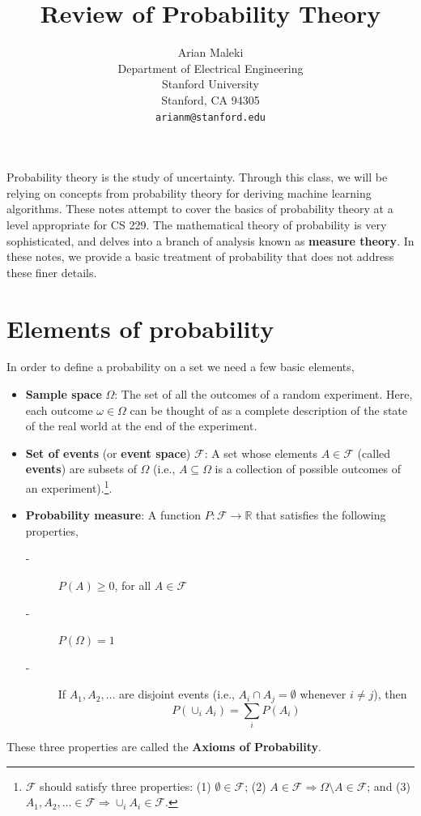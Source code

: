 \documentclass{article}
\title{Review of Probability Theory}
\author{
Arian Maleki \\
Department of Electrical Engineering\\
Stanford University\\
Stanford, CA 94305 \\
\texttt{arianm@stanford.edu} \\
}
\begin{document}
\makeanontitle

Probability theory is the study of uncertainty.  Through this class, we will be relying on concepts from probability
theory for deriving machine learning algorithms.  These notes attempt to cover the basics of probability theory at a
level appropriate for CS 229.  The mathematical theory of probability is very sophisticated, and
delves into a branch of analysis known as \textbf{measure theory}.  In
these notes, we provide a basic treatment of probability that does
not address these finer details.  

\section{Elements of probability}

In order to define a probability on a set we need a few basic elements,
\begin{itemize}
\item \textbf{Sample space} $\Omega$: The set of all the outcomes of a random
  experiment.  Here, each outcome $\omega \in \Omega$ can be thought
  of as a complete description of the state of the real world at the
  end of the experiment.
\item \textbf{Set of events} (or \textbf{event space}) $\mathcal{F}$: 
  A set whose
  elements $A \in \mathcal{F}$ (called \textbf{events}) are subsets of $\Omega$
  (i.e., $A \subseteq \Omega$ is a collection of possible outcomes of an
  experiment).\footnote{
  $\mathcal{F}$ should satisfy three properties: 
  (1) $\emptyset \in \mathcal{F}$;
  (2) $A \in \mathcal{F} \Longrightarrow \Omega \setminus A \in \mathcal{F}$; and
  (3) $A_1, A_2 , \ldots \in \mathcal{F} \Longrightarrow \cup_i A_i \in \mathcal{F}$.
}.
\item \textbf{Probability measure}: A function $P : \mathcal{F} \rightarrow \mathbb{R}$ that satisfies the following properties,
       \begin{description}
          \item[-] $P(A) \geq 0$, for all $A \in \mathcal{F}$
          \item[-] $P(\Omega)=1$
          \item[-] If $A_1,A_2, \ldots$ are disjoint events (i.e., $A_i \cap A_j= \emptyset$ whenever $i \neq j$), then
          \begin{equation*}
            P(\cup_{i} A_i)= \sum_i P(A_i)
          \end{equation*}
        \end{description}
\end{itemize}
These three properties are called the \textbf{Axioms of Probability}.
\end{document}
